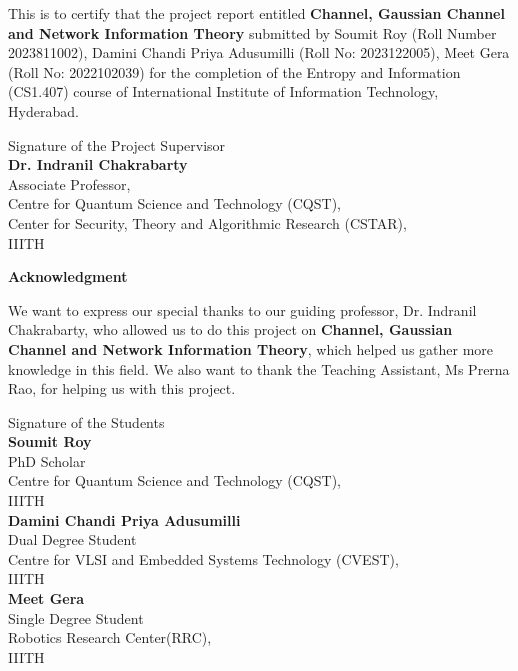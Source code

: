 \noindent This is to certify that the project report entitled \textbf{Channel, Gaussian Channel and Network Information Theory} submitted by Soumit Roy (Roll Number 2023811002), Damini Chandi Priya Adusumilli (Roll No: 2023122005), Meet Gera (Roll No: 2022102039)  for the completion of the Entropy and Information (CS1.407) course of International Institute of Information Technology, Hyderabad.

\vspace{6em}
\begin{flushright}
	Signature of the Project Supervisor\\
	\vspace{1em}
	\textbf{\large Dr. Indranil Chakrabarty}\\
        Associate Professor,\\
        Centre for Quantum Science and Technology (CQST),\\
        Center for Security, Theory and Algorithmic Research (CSTAR),\\
        IIITH
\end{flushright}

\newpage
\vspace*{12em}
\begin{center}
	{\huge \textbf{Acknowledgment}}
\end{center} 
We want to express our special thanks to our guiding professor, Dr. Indranil Chakrabarty, who allowed us to do this project on \textbf{Channel, Gaussian Channel and Network Information Theory}, which helped us gather more knowledge in this field. We also want to thank the Teaching Assistant, Ms Prerna Rao, for helping us with this project.\\

\vspace{1em}
\begin{flushright}
	Signature of the Students\\
	\vspace{4em}
	\textbf{Soumit Roy}\\
        PhD Scholar\\
        Centre for Quantum Science and Technology (CQST),\\ IIITH\\
	\vspace{4em}
	\textbf{Damini Chandi Priya Adusumilli}\\
        Dual Degree Student\\
        Centre for VLSI and Embedded Systems Technology (CVEST),\\ 
        IIITH\\
	\vspace{4em}
	\textbf{Meet Gera}\\
        Single Degree Student\\
        Robotics Research Center(RRC), \\
        IIITH\\
\end{flushright}